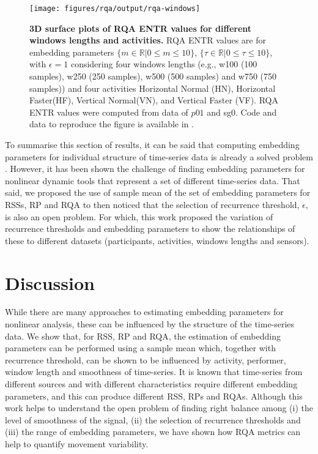 \documentclass[fleqn,10pt]{wlscirep}
\begin{document}
\begin{figure}[ht]
\centering
\texttt{[image: figures/rqa/output/rqa-windows]}
    \caption{
	{\bf 3D surface plots of RQA ENTR values for different windows lengths and activities.}
	RQA ENTR values are for embedding parameters
	$ \{ m \in \mathbb{R} | 0 \le m \le 10  \}$,
	$ \{ \tau \in \mathbb{R} | 0 \le \tau \le 10  \}$, 
	with $\epsilon = 1 $ considering four 
	windows lengths (e.g., w100 (100 samples), w250 (250 samples),
	w500 (500 samples) and w750 (750 samples)) and
	four activities 
	Horizontal Normal (HN), Horizontal Faster(HF), Vertical Normal(VN), and 
	Vertical Faster (VF).
	RQA ENTR values were computed from data of $p01$ and sg0.
	Code and data to reproduce the figure is available in \cite{srep2020}.
       }
\label{fig:3dRQAENTR_windowsactivities}
\end{figure}

To summarise this section of results, it can be said that computing
embedding parameters for individual structure of time-series 
data is already a solved problem \cite{frank2010, sama2013, bradley2015}. 
However, it has been shown the challenge of finding embedding parameters
for nonlinear dynamic tools that represent a set of different time-series data.
That said, we proposed the use of sample mean of the set of embedding parameters
for RSSs, RP and RQA to then noticed that the selection of recurrence 
threshold, $\epsilon$, is also an open problem.
For which, this work proposed the variation of recurrence thresholds 
and embedding parameters to show the relationships of these to different datasets 
(participants, activities, windows lengths and sensors).

\section*{Discussion}
While there are many approaches to estimating embedding parameters for nonlinear analysis, 
these can be influenced by the structure of the time-series data.   
We show that, for RSS, RP and RQA, the estimation of embedding parameters can be performed 
using a sample mean which, together with recurrence threshold, can be shown to be 
influenced by activity, performer, window length and smoothness of time-series.  
It is known that time-series from different sources and with different characteristics 
require different embedding parameters, and this can produce different RSS, RPs and RQAs. 
Although this work helps to understand the open problem of 
finding right balance among (i) the level of smoothness of the signal, 
(ii) the selection of recurrence thresholds and (iii) 
the range of embedding parameters, 
we have shown how RQA metrics can help to quantify movement variability.
\end{document}
